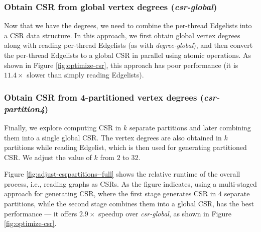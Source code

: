 \subsubsection{Obtain CSR from global vertex degrees (\textit{csr-global})}
\label{sec:csr-csr-global}

Now that we have the degrees, we need to combine the per-thread Edgelists into a CSR data structure. In this approach, we first obtain global vertex degrees along with reading per-thread Edgelists (as with \textit{degree-global}), and then convert the per-thread Edgelists to a global CSR in parallel using atomic operations. As shown in Figure \ref{fig:optimize-csr}, this approach has poor performance (it is $11.4\times$ slower than simply reading Edgelists).





\subsubsection{Obtain CSR from 4-partitioned vertex degrees (\textit{csr-partition4})}
\label{sec:csr-csr-partition4}

Finally, we explore computing CSR in $k$ separate partitions and later combining them into a single global CSR. The vertex degrees are also obtained in $k$ partitions while reading Edgelist, which is then used for generating partitioned CSR. We adjust the value of $k$ from $2$ to $32$. Figure \ref{fig:adjust-csrpartitions--full} shows the relative runtime of the overall process, i.e., reading graphs as CSRs. As the figure indicates, using a multi-staged approach for generating CSR, where the first stage generates CSR in $4$ separate partitions, while the second stage combines them into a global CSR, has the best performance --- it offers $2.9\times$ speedup over \textit{csr-global}, as shown in Figure \ref{fig:optimize-csr}.

